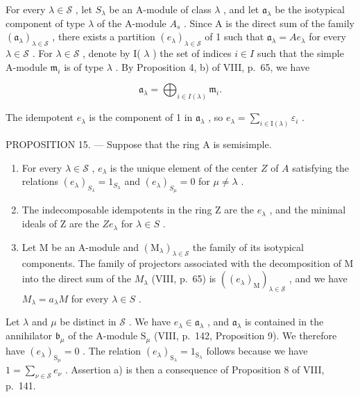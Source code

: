 For every \(\lambda \in \mathcal{S}\) , let \(S_{\lambda}\) be an A-module of class \(\lambda\) , and let \(\mathfrak{a}_{\lambda}\) be the isotypical component of type \(\lambda\) of the A-module \(A_s\) . Since A is the direct sum of the family \((\mathfrak{a}_{\lambda})_{\lambda \in \mathcal{S}}\) , there exists a partition \((e_{\lambda})_{\lambda \in \mathcal{S}}\) of 1 such that \(\mathfrak{a}_{\lambda} = Ae_{\lambda}\) for every \(\lambda \in \mathcal{S}\) . For \(\lambda \in \mathcal{S}\) , denote by I( \(\lambda\) ) the set of indices \(i \in I\) such that the simple A-module \(\mathfrak{m}_i\) is of type \(\lambda\) . By Proposition 4, b) of VIII, p.~65, we have

\[
\mathfrak {a} _ {\lambda} = \bigoplus_ {i \in I (\lambda)} \mathfrak {m} _ {i}.\tag{3}
\]

The idempotent \(e_{\lambda}\) is the component of 1 in \(\mathfrak{a}_{\lambda}\) , so \(e_{\lambda} = \sum_{i\in \mathrm{I}(\lambda)}\varepsilon_i\) .

PROPOSITION 15. --- Suppose that the ring A is semisimple.

\begin{enumerate}
\def\labelenumi{\alph{enumi})}
\item
  For every \(\lambda \in \mathcal{S}\) , \(e_{\lambda}\) is the unique element of the center \(Z\) of \(A\) satisfying the relations \((e_{\lambda})_{S_{\lambda}} = 1_{S_{\lambda}}\) and \((e_{\lambda})_{S_{\mu}} = 0\) for \(\mu \neq \lambda\) .
\item
  The indecomposable idempotents in the ring Z are the \(e_{\lambda}\) , and the minimal ideals of Z are the \(Ze_{\lambda}\) for \(\lambda \in S\) .
\item
  Let M be an A-module and \((\mathrm{M}_{\lambda})_{\lambda\in\mathcal{S}}\) the family of its isotypical components. The family of projectors associated with the decomposition of M into the direct sum of the \(M_{\lambda}\) (VIII, p.~65) is \(((e_{\lambda})_{\mathrm{M}})_{\lambda\in\mathcal{S}}\) , and we have \(M_{\lambda}=a_{\lambda}M\) for every \(\lambda\in S\) .
\end{enumerate}

Let \(\lambda\) and \(\mu\) be distinct in \(\mathcal{S}\) . We have \(e_{\lambda} \in \mathfrak{a}_{\lambda}\) , and \(\mathfrak{a}_{\lambda}\) is contained in the annihilator \(\mathfrak{b}_{\mu}\) of the A-module \(\mathrm{S}_{\mu}\) (VIII, p.~142, Proposition 9). We therefore have \((e_{\lambda})_{\mathrm{S}_{\mu}} = 0\) . The relation \((e_{\lambda})_{\mathrm{S}_{\lambda}} = 1_{\mathrm{S}_{\lambda}}\) follows because we have \(1 = \sum_{\nu \in \mathcal{S}} e_{\nu}\) . Assertion a) is then a consequence of Proposition 8 of VIII, p.~141.

